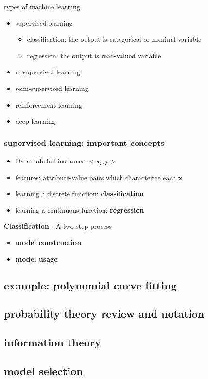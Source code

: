 \documentclass[11pt]{article}
\newcommand{\bl}[1] {\boldsymbol{#1}}
\begin{document}
types of machine learning
\begin{itemize}
\item supervised learning
\begin{itemize}
\item classification: the output is categorical or nominal variable
\item regression: the output is read-valued variable
\end{itemize}
\item unsupervised learning
\item semi-supervised learning
\item reinforcement learning
\item deep learning
\end{itemize}
\subsubsection{supervised learning: important concepts}
\label{sec:org89be3a4}
\begin{itemize}
\item Data: labeled instances \(<\bl{x}_i,\bl{y}>\)
\item features: attribute-value pairs which characterize each \(\bl{x}\)
\item learning a discrete function: \textbf{classification}
\item learning a continuous function: \textbf{regression}
\end{itemize}

\textbf{Classification} - A two-step process
\begin{itemize}
\item \textbf{model construction}
\item \textbf{model usage}
\end{itemize}
\subsection{example: polynomial curve fitting}
\label{sec:org18fc0e6}
\subsection{probability theory review and notation}
\label{sec:org47b68f9}
\subsection{information theory}
\label{sec:org6782f8d}
\subsection{model selection}
\label{sec:org7531087}
\end{document}
